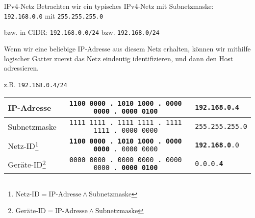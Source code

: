 \begin{example}{IPv4-Netz}
    Betrachten wir ein typisches IPv4-Netz mit Subnetzmaske:
    \texttt{192.168.0.0} mit \texttt{255.255.255.0}

    bzw. in CIDR:
    \texttt{192.168.0.0/24} bzw. \texttt{192.168.0/24}

    Wenn wir eine beliebige IP-Adresse aus diesem Netz erhalten, können wir mithilfe logischer Gatter zuerst das Netz eindeutig identifizieren, und dann den Host adressieren.

    z.B. \texttt{192.168.0.4/24}

    \begin{center}
        \begin{tabular}{|l||c|l|}
            \hline
            IP-Adresse                                                                                     & \texttt{1100 0000 . 1010 1000 . 0000 0000 . 0000 0100}          & \texttt{192.168.0.4}          \\\hline
            Subnetzmaske                                                                                   & \texttt{1111 1111 . 1111 1111 . 1111 1111 . 0000 0000}          & \texttt{255.255.255.0}        \\\hline
            Netz-ID\footnote{$\text{Netz-ID} = \text{IP-Adresse} \land \text{Subnetzmaske}$}               & \texttt{\textbf{1100 0000 . 1010 1000 . 0000 0000} . 0000 0000} & \texttt{\textbf{192.168.0}.0} \\\hline
            Geräte-ID\footnote{$\text{Geräte-ID} = \text{IP-Adresse} \land	\overline{\text{Subnetzmaske}}$} & \texttt{0000 0000 . 0000 0000 . 0000 0000 . \textbf{0000 0100}} & \texttt{0.0.0.\textbf{4}}     \\\hline
        \end{tabular}
    \end{center}
\end{example}

